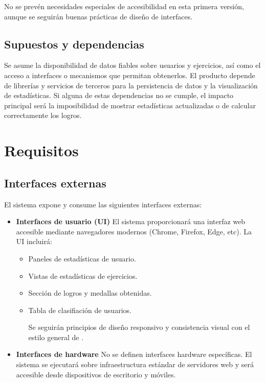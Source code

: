 No se prevén necesidades especiales de accesibilidad en esta primera versión, aunque se seguirán buenas prácticas de diseño de interfaces.

\subsection{Supuestos y dependencias}

Se asume la disponibilidad de datos fiables sobre usuarios y ejercicios, así como el acceso a interfaces o mecanismos que permitan obtenerlos. El producto depende de librerías y servicios de terceros para la persistencia de datos y la visualización de estadísticas. Si alguna de estas dependencias no se cumple, el impacto principal será la imposibilidad de mostrar estadísticas actualizadas o de calcular correctamente los logros.

\section{Requisitos}

\subsection{Interfaces externas}

El sistema expone y consume las siguientes interfaces externas:
\begin{itemize}
    \item \textbf{Interfaces de usuario (UI)}
 El sistema proporcionará una interfaz web accesible mediante navegadores modernos (Chrome, Firefox, Edge, etc).
 La UI incluirá:
    \begin{itemize}
        \item Paneles de estadísticas de usuario.
        \item Vistas de estadísticas de ejercicios.
        \item Sección de logros y medallas obtenidas.
        \item Tabla de clasifiación de usuarios.

 Se seguirán principios de diseño responsivo y consistencia visual con el estilo general de \aer.
    \end{itemize}

    \item \textbf{Interfaces de hardware}
 No se definen interfaces hardware específicas. El sistema se ejecutará sobre infraestructura estándar de servidores web y será accesible desde dispositivos de escritorio y móviles.
\end{itemize}

